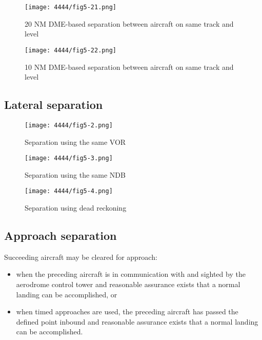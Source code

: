 \begin{figure}[htbp]
  \centering
  \texttt{[image: 4444/fig5-21.png]}
  \caption{20 NM DME-based separation between aircraft on same track and
    level~\cite{4444}}
  \label{fig:separation:long:dme20}
\end{figure}

\begin{figure}[htbp]
  \centering
  \texttt{[image: 4444/fig5-22.png]}
  \caption{10 NM DME-based separation between aircraft on same track and
    level~\cite{4444}}
  \label{fig:separation:long:dme10}
\end{figure}

\subsection{Lateral separation}

\begin{figure}[htbp]
  \centering
  \texttt{[image: 4444/fig5-2.png]}
  \caption{Separation using the same VOR~\cite{4444}}
  \label{fig:separation:lat:vor}
\end{figure}

\begin{figure}[htbp]
  \centering
  \texttt{[image: 4444/fig5-3.png]}
  \caption{Separation using the same NDB~\cite{4444}}
  \label{fig:separation:lat:ndb}
\end{figure}

\begin{figure}[htbp]
  \centering
  \texttt{[image: 4444/fig5-4.png]}
  \caption{Separation using dead reckoning~\cite{4444}}
  \label{fig:separation:lat:fix}
\end{figure}

\subsection{Approach separation}

Succeeding aircraft may be cleared for approach:
\begin{itemize}
\item when the preceding aircraft is in communication with
  and sighted by the aerodrome control tower and
  reasonable assurance exists that a normal landing can
  be accomplished, or
\item when timed approaches are used, the preceding aircraft
  has passed the defined point inbound and reasonable
  assurance exists that a normal landing can be
  accomplished.
\end{itemize}

